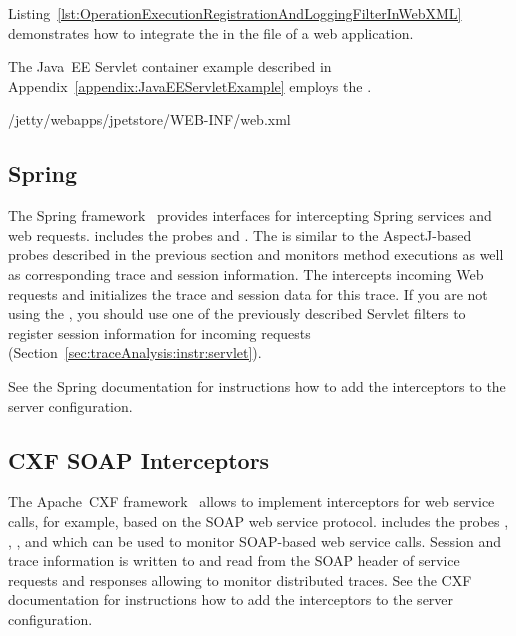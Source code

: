 
Listing~\ref{lst:OperationExecutionRegistrationAndLoggingFilterInWebXML} %
demonstrates how to integrate the  %
in the  file of a web application.

The Java~EE Servlet container example described in Appendix~\ref{appendix:JavaEEServletExample} employs the %
.

\pagebreak

\setXMLListing
%
{\JavaEEServletExampleDir/jetty/webapps/jpetstore/WEB-INF/web.xml}


\subsection{Spring}\label{sec:traceAnalysis:instr:spring}

The Spring framework~\cite{Spring-WebSite} provides interfaces for intercepting %
Spring services and web requests. %
\Kieker{} includes the probes %
 and
. %
The  is similar to the %
AspectJ-based probes described in the previous section and monitors method %
executions as well as corresponding trace and session information. %
The  intercepts %
incoming Web requests and initializes the trace and session data for this %
trace. If you are not using the , %
you should use one of the previously described Servlet filters to register %
session information for incoming requests %
(Section~\ref{sec:traceAnalysis:instr:servlet}).

See the Spring documentation for instructions how to add the interceptors %
to the server configuration.

\subsection{CXF SOAP Interceptors}\label{sec:traceAnalysis:instr:cxf}

The Apache~CXF framework~\cite{CXF-WebSite} allows to implement interceptors for web service calls, %
for example, based on the SOAP web service protocol. %
\Kieker{} includes the probes %
, %
, %
, and %
 which can be used to %
monitor SOAP-based web service calls. %
Session and trace information is written to and read from the SOAP header of %
service requests and responses allowing to monitor distributed traces. %
See the CXF documentation for instructions how to add the interceptors %
to the server configuration.

